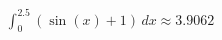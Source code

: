 \documentclass[preview]{standalone}
\begin{document}
\begin{align*}
\int_{0}^{2.5} \left(\sin(x) + 1\right) \, dx \approx 3.9062
\end{align*}
\end{document}
